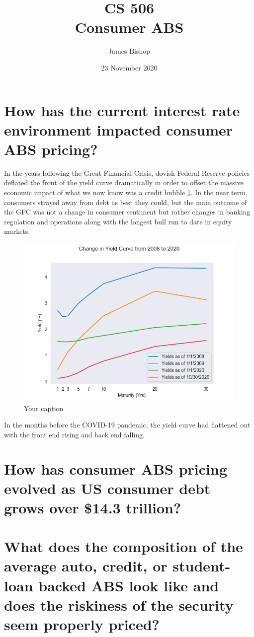 \documentclass[11pt]{article}
\title{ CS 506 \\ Consumer ABS}
\date{23 November 2020}
\author{James Bishop }
\begin{document}
\maketitle

\section*{How has the current interest rate environment impacted consumer ABS pricing?}
In the years following the Great Financial Crisis, dovish Federal Reserve policies deflated the front of the yield curve dramatically in order to offset the massive economic impact of what we now know was a credit bubble \ref{YieldCurve}. In the near term, consumers strayed away from debt as best they could, but the main outcome of the GFC was not a change in consumer sentiment but rather changes in banking regulation and operations along with the longest bull run to date in equity markets. \begin{figure}[h]
    \centering
    \includegraphics[scale=0.5]{YieldCurve}
    \caption{Your caption}
    \label{YieldCurve}
\end{figure}

In the months before the COVID-19 pandemic, the yield curve had flattened out with the front end rising and back end falling. 


\section*{How has consumer ABS pricing evolved as US consumer debt grows over \$14.3 trillion?}


\section*{What does the composition of the average auto, credit, or student-loan backed ABS look like and does the riskiness of the security seem properly priced?}
\end{document}
